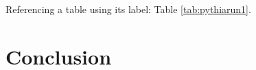 \documentclass[
	a4paper, %
	10pt, %
	unnumberedsections, %
	twoside, %
]{LTJournalArticle}
\begin{document}
Referencing a table using its label: Table \ref{tab:pythiarun1}.


\section{Conclusion}



\printbibliography %

\end{document}
